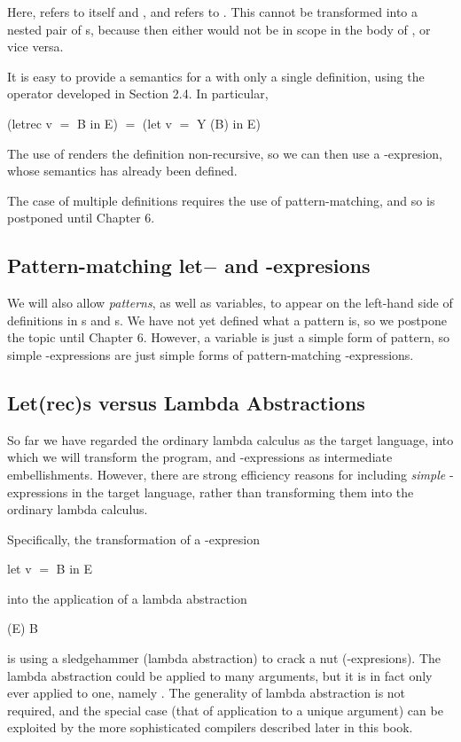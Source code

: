 Here,  refers to itself and , and  refers to . This cannot be transformed into a nested pair of s, because then either  would not be in scope in the body of , or vice versa.

It is easy to provide a semantics for a  with only a single definition, using the  operator developed in Section 2.4. In particular,
\begin{mlcoded}
    (letrec v $=$ B in E) $=$ (let v $=$ Y (B) in E)
\end{mlcoded}
The use of  renders the definition non-recursive, so we can then use a -expresion, whose semantics has already been defined.

The case of multiple definitions requires the use of pattern-matching, and so is postponed until Chapter 6.

\subsection{Pattern-matching let$-$ and -expresions}
We will also allow \textit{patterns}, as well as variables, to appear on the left-hand side of definitions in s and s. We have not yet defined what a pattern is, so we postpone the topic until Chapter 6. However, a variable is just a simple form of pattern, so simple -expressions are just simple forms of pattern-matching -expressions.

\subsection{Let(rec)s versus Lambda Abstractions}
So far we have regarded the ordinary lambda calculus as the target language, into which we will transform the program, and -expressions as intermediate embellishments. However, there are strong efficiency reasons for including \textit{simple} -expressions in the target language, rather than transforming them into the ordinary lambda calculus.

Specifically, the transformation of a -expresion
\begin{mlcoded}
    let v $=$ B in E
\end{mlcoded}
into the application of a lambda abstraction
\begin{mlcoded}
    (E) B
\end{mlcoded}
is using a sledgehammer (lambda abstraction) to crack a nut (-expresions). The lambda abstraction  could be applied to many arguments, but it is in fact only ever applied to one, namely . The generality of lambda abstraction is not required, and the special case (that of application to a unique argument) can be exploited by the more sophisticated compilers described later in this book.

